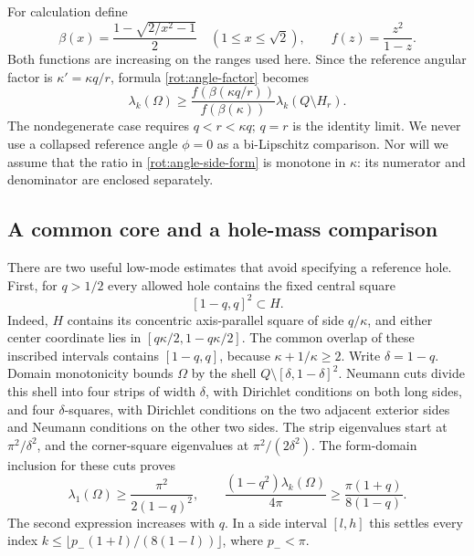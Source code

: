 \documentclass[11pt,reqno]{amsart}
\numberwithin{equation}{section}
\begin{document}
For calculation define
\begin{equation}\label{rot:beta-function}
 \beta(x)=\frac{1-\sqrt{2/x^2-1}}2\quad(1\leq x\leq\sqrt2),
 \qquad f(z)=\frac{z^2}{1-z}.
\end{equation}
Both functions are increasing on the ranges used here. Since the
reference angular factor is $\kappa' =\kappa q/r$, formula
\eqref{rot:angle-factor} becomes
\begin{equation}\label{rot:angle-side-form}
 \lambda_k(\Omega)\geq
 \frac{f(\beta(\kappa q/r))}{f(\beta(\kappa))}
 \lambda_k(Q\setminus H_r).
\end{equation}
The nondegenerate case requires $q<r<\kappa q$; $q=r$ is the identity
limit. We never use a collapsed reference angle $\phi=0$ as a
bi-Lipschitz comparison. Nor will we assume that the ratio in
\eqref{rot:angle-side-form} is monotone in $\kappa$: its numerator and
denominator are enclosed separately.

\subsection{A common core and a hole-mass comparison}
\label{rot:core-gram}

There are two useful low-mode estimates that avoid specifying a
reference hole. First, for $q>1/2$ every allowed hole contains the
fixed central square
\begin{equation}\label{rot:common-core}
 [1-q,q]^2\subset H.
\end{equation}
Indeed, $H$ contains its concentric axis-parallel square of side
$q/\kappa$, and either center coordinate lies in
$[q\kappa/2,1-q\kappa/2]$. The common overlap of these inscribed
intervals contains $[1-q,q]$, because $\kappa+1/\kappa\geq2$.
Write $\delta=1-q$. Domain monotonicity bounds $\Omega$ by the shell
$Q\setminus[\delta,1-\delta]^2$. Neumann cuts divide this shell into
four strips of width $\delta$, with Dirichlet conditions on both long
sides, and four $\delta$-squares, with Dirichlet conditions on the two
adjacent exterior sides and Neumann conditions on the other two sides.
The strip eigenvalues start at $\pi^2/\delta^2$, and the corner-square
eigenvalues at $\pi^2/(2\delta^2)$. The form-domain inclusion for these
cuts proves
\begin{equation}\label{rot:core-first}
 \lambda_1(\Omega)\geq\frac{\pi^2}{2(1-q)^2},\qquad
 \frac{(1-q^2)\lambda_k(\Omega)}{4\pi}
       \geq\frac{\pi(1+q)}{8(1-q)}.
\end{equation}
The second expression increases with $q$. In a side interval $[l,h]$
this settles every index
$k\leq\lfloor p_-(1+l)/(8(1-l))\rfloor$, where $p_-<\pi$.
\end{document}
